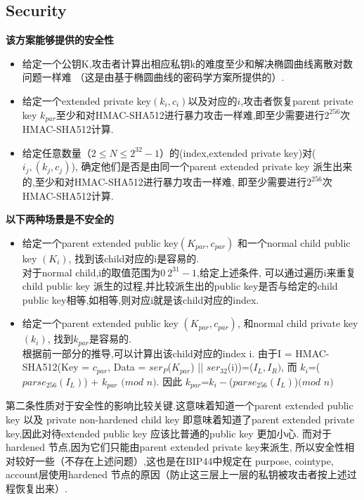 \subsection{Security}
\label{sec-security}
\textbf{该方案能够提供的安全性}
\begin{itemize}
\item 给定一个公钥K,攻击者计算出相应私钥k的难度至少和解决椭圆曲线离散对数问题一样难
（这是由基于椭圆曲线的密码学方案所提供的）.
\item 给定一个extended private key$(k_i,c_i)$以及对应的$i$,攻击者恢复parent private key $k_{par}$至少和对HMAC-SHA512进行暴力攻击一样难,即至少需要进行$2^{256}$次HMAC-SHA512计算.
\item 给定任意数量（$2\leq N\leq 2^{32}-1$）的(index,extended private key)对($i_j,(k_j,c_j)$),
确定他们是否是由同一个parent extended private key 派生出来的,至少和对HMAC-SHA512进行暴力攻击一样难,
即至少需要进行$2^{256}$次HMAC-SHA512计算.
\end{itemize}

\textbf{以下两种场景是不安全的}
\begin{itemize}
\item 给定一个parent extended public key$(K_{par},c_{par})$ 和一个normal child public key $(K_i)$,
找到该child对应的i是容易的.\\
对于normal child,i的取值范围为$0~2^{31}-1$,给定上述条件,
可以通过遍历i来重复child public key 派生的过程,并比较派生出的public key是否与给定的child public key相等,如相等,则对应i就是该child对应的index.

\item 给定一个parent extended public key $(K_{par},c_{par})$, 
和normal child private key $(k_i)$, 找到$k_{par}$是容易的.\\
根据前一部分的推导,可以计算出该child对应的index i.  
由于I = HMAC-SHA512(Key = $c_{par}$, Data = $ser_P$($K_{par}$) || $ser_{32}$(i))=($I_L,I_R)$, 
而 $k_i$=($parse_{256}(I_L)$) + $k_{par}$ $(mod$ $n)$.   
因此 $k_{par}$=$k_i-$($parse_{256}(I_L)$)$(mod$ $n)$
\end{itemize}    

第二条性质对于安全性的影响比较关键.这意味着知道一个parent extended public key 
以及 private non-hardened child key
即意味着知道了parent extended private key,因此对待extended public key 
应该比普通的public key 更加小心.
而对于hardened 节点,因为它们只能由parent extended private key来派生,
所以安全性相对较好一些（不存在上述问题）,这也是在BIP44中规定在
purpose, cointype, account层使用hardened 节点的原因（防止这三层上一层的私钥被攻击者按上述过程恢复出来）.


